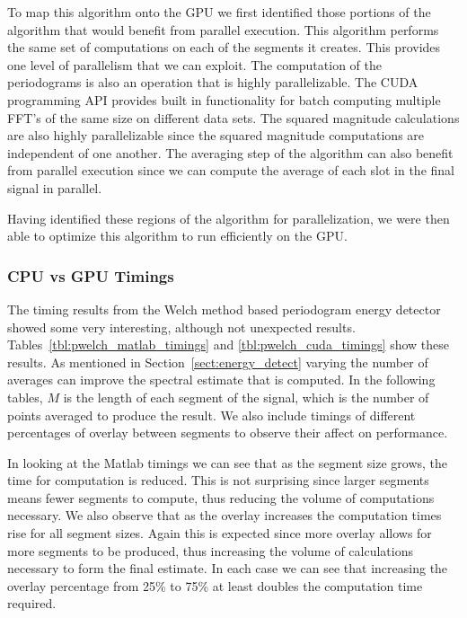 To map this algorithm onto the GPU we first identified those portions of the algorithm that would benefit from parallel execution.  This algorithm performs the same set of computations on each of the segments it creates.  This provides one level of parallelism that we can exploit.  The computation of the periodograms is also an operation that is highly parallelizable.  The CUDA programming API provides built in functionality for batch computing multiple FFT's of the same size on different data sets.  The squared magnitude calculations are also highly parallelizable since the squared magnitude computations are independent of one another.  The averaging step of the algorithm can also benefit from parallel execution since we can compute the average of each slot in the final signal in parallel.

Having identified these regions of the algorithm for parallelization, we were then able to optimize this algorithm to run efficiently on the GPU.
\subsubsection{CPU vs GPU Timings}
The timing results from the Welch method based periodogram energy detector showed some very interesting, although not unexpected results.  Tables~\ref{tbl:pwelch_matlab_timings} and \ref{tbl:pwelch_cuda_timings} show these results.  As mentioned in Section~\ref{sect:energy_detect} varying the number of averages can improve the spectral estimate that is computed.  In the following tables, $M$ is the length of each segment of the signal, which is the number of points averaged to produce the result.  We also include timings of different percentages of overlay between segments to observe their affect on performance.

In looking at the Matlab timings we can see that as the segment size grows, the time for computation is reduced.  This is not surprising since larger segments means fewer segments to compute, thus reducing the volume of computations necessary.  We also observe that as the overlay increases the computation times rise for all segment sizes.  Again this is expected since more overlay allows for more segments to be produced, thus increasing the volume of calculations necessary to form the final estimate.  In each case we can see that increasing the overlay percentage from 25\% to 75\% at least doubles the computation time required.
 
